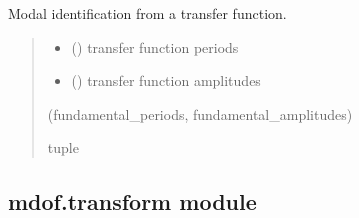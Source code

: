 \documentclass[letterpaper,10pt,english]{sphinxmanual}
\begin{document}

\begin{fulllineitems}
\label{\detokenize{library/mdof.modal:mdof.modal.spectrum_modes}}
\pysigstartsignatures
{}
\pysigstopsignatures
\sphinxAtStartPar
Modal identification from a transfer function.
\begin{quote}\begin{description}
\begin{itemize}
\item {} 
\sphinxAtStartPar
{} () \textendash{} transfer function periods

\item {} 
\sphinxAtStartPar
{} () \textendash{} transfer function amplitudes

\end{itemize}

\sphinxAtStartPar
(fundamental\_periods, fundamental\_amplitudes)

\sphinxAtStartPar
tuple

\end{description}\end{quote}

\end{fulllineitems}


\sphinxstepscope


\subsection{mdof.transform module}
\label{\detokenize{library/mdof.transform:module-mdof.transform}}\label{\detokenize{library/mdof.transform:mdof-transform-module}}\label{\detokenize{library/mdof.transform::doc}}
\end{document}
